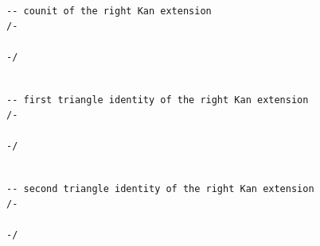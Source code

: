 \documentclass{book}
\theoremstyle{definition}
\newcounter{lcounter}
\begin{document}
{{\begin{center}
\begin{tcolorbox}[width=5in,colback={white},title={\begin{center}\texttt{Lean \thelcounter} \addtocounter{lcounter}{1}  \end{center}},colbacktitle=Blue,coltitle=black]
\begin{verbatim}
\end{verbatim}
\end{tcolorbox}
\end{center}

\begin{center}
\begin{tcolorbox}[width=5in,colback={white},title={\begin{center}\texttt{Lean \thelcounter} \addtocounter{lcounter}{1}  \end{center}},colbacktitle=Blue,coltitle=black]
\begin{verbatim}

-- counit of the right Kan extension
/-

-/

\end{verbatim}
\end{tcolorbox}
\end{center}

\begin{center}
\begin{tcolorbox}[width=5in,colback={white},title={\begin{center}\texttt{Lean \thelcounter} \addtocounter{lcounter}{1}  \end{center}},colbacktitle=Blue,coltitle=black]
\begin{verbatim}

-- first triangle identity of the right Kan extension
/-

-/

\end{verbatim}
\end{tcolorbox}
\end{center}

\begin{center}
\begin{tcolorbox}[width=5in,colback={white},title={\begin{center}\texttt{Lean \thelcounter} \addtocounter{lcounter}{1}  \end{center}},colbacktitle=Blue,coltitle=black]
\begin{verbatim}

-- second triangle identity of the right Kan extension
/-

-/

\end{verbatim}
\end{tcolorbox}
\end{center}

}}
\end{document}
